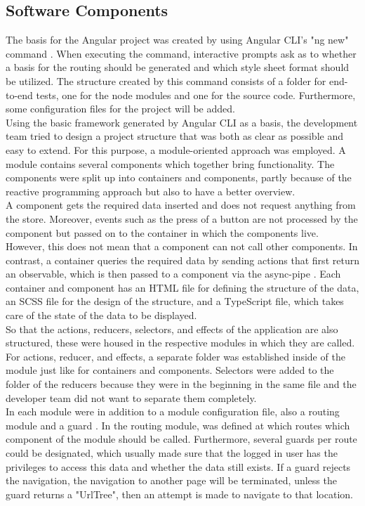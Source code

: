 \documentclass[Bachelor,BIF,english]{twbook}
\begin{document}
\subsection{Software Components}
The basis for the Angular project was created by using Angular CLI's \cite{AngularCli} "ng new" command \cite{AngularCli}. When executing the command, interactive prompts ask as to whether a basis for the routing should be generated and which style sheet format should be utilized. The structure created by this command consists of a folder for end-to-end tests, one for the node modules and one for the source code. Furthermore, some configuration files for the project will be added.
\\[\baselineskip]
Using the basic framework generated by Angular CLI as a basis, the development team tried to design a project structure that was both as clear as possible and easy to extend. For this purpose, a module-oriented approach was employed. A module contains several components which together bring functionality. The components were split up into containers and components, partly because of the reactive programming approach but also to have a better overview.
\\[\baselineskip]
A component gets the required data inserted and does not request anything from the store. Moreover, events such as the press of a button are not processed by the component but passed on to the container in which the components live. However, this does not mean that a component can not call other components. In contrast, a container queries the required data by sending actions that first return an observable, which is then passed to a component via the async-pipe \cite{AngularAsyncPipe}. Each container and component has an HTML file for defining the structure of the data, an SCSS \cite{Sass} file for the design of the structure, and a TypeScript file, which takes care of the state of the data to be displayed.
\\[\baselineskip]
So that the actions, reducers, selectors, and effects of the application are also structured, these were housed in the respective modules in which they are called. For actions, reducer, and effects, a separate folder was established inside of the module just like for containers and components. Selectors were added to the folder of the reducers because they were in the beginning in the same file and the developer team did not want to separate them completely.
\\[\baselineskip]
In each module were in addition to a module configuration file, also a routing module and a guard \cite{AngularGuard}. In the routing module, was defined at which routes which component of the module should be called. Furthermore, several guards per route could be designated, which usually made sure that the logged in user has the privileges to access this data and whether the data still exists. If a guard rejects the navigation, the navigation to another page will be terminated, unless the guard returns a "UrlTree", then an attempt is made to navigate to that location.
\end{document}
